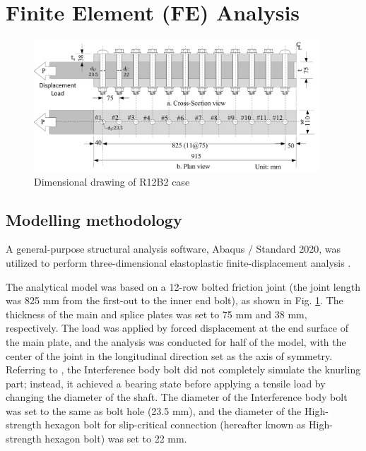 \section{Finite Element (FE) Analysis}

\begin{figure}[htbp]
    \centering
    \includegraphics[width=0.95\textwidth]{imgs/ch5/femodelsize.pdf}
    \caption{Dimensional drawing of R12B2 case}
    \label{fig-modelsize}
\end{figure}

\subsection{Modelling methodology}

A general-purpose structural analysis software, Abaqus / Standard 2020, was utilized to perform three-dimensional elastoplastic finite-displacement analysis \cite{Smith2020}. \par
The analytical model was based on a 12-row bolted friction joint (the joint length was 825 mm from the first-out to the inner end bolt), as shown in Fig. \ref{fig-modelsize}. The thickness of the main and splice plates was set to 75 mm and 38 mm, respectively. The load was applied by forced displacement at the end surface of the main plate, and the analysis was conducted for half of the model, with the center of the joint in the longitudinal direction set as the axis of symmetry. Referring to \cite{Shimozato2008ExperrimentalModel}, the Interference body bolt did not completely simulate the knurling part; instead, it achieved a bearing state before applying a tensile load by changing the diameter of the shaft. The diameter of the Interference body bolt was set to the same as bolt hole (23.5 mm), and the diameter of the High-strength hexagon bolt for slip-critical connection (hereafter known as High-strength hexagon bolt) was set to 22 mm. \par

